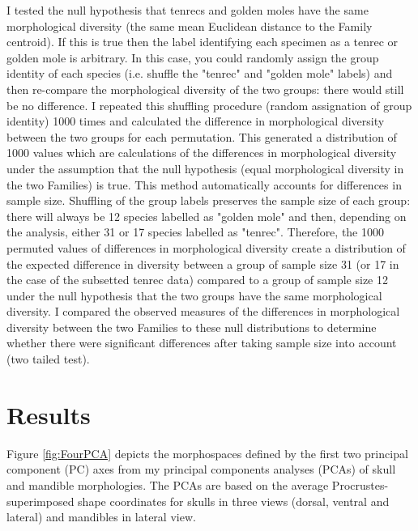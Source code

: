 
	I tested the null hypothesis that tenrecs and golden moles have the same morphological diversity (the same mean Euclidean distance to the Family centroid). If this is true then the label identifying each specimen as a tenrec or golden mole is arbitrary. In this case, you could randomly assign the group identity of each species (i.e. shuffle the "tenrec" and "golden mole" labels) and then re-compare the morphological diversity of the two groups: there would still be no difference. I repeated this shuffling procedure (random assignation of group identity) 1000 times and calculated the difference in morphological diversity between the two groups for each permutation. This generated a distribution of 1000 values which are calculations of the differences in morphological diversity under the assumption that the null hypothesis (equal morphological diversity in the two Families) is true. This method automatically accounts for differences in sample size. Shuffling of the group labels preserves the sample size of each group: there will always be 12 species labelled as "golden mole" and then, depending on the analysis, either 31 or 17 species labelled as "tenrec". Therefore, the 1000 permuted values of differences in morphological diversity create a distribution of the expected difference in diversity between a group of sample size 31 (or 17 in the case of the subsetted tenrec data) compared to a group of sample size 12 under the null hypothesis that the two groups have the same morphological diversity. I compared the observed measures of the differences in morphological diversity between the two Families to these null distributions to determine whether there were significant differences after taking sample size into account (two tailed test).

	
\newpage
\section{Results}
\label{sect:results}

	Figure \ref{fig:FourPCA} depicts the morphospaces defined by the first two principal component (PC) axes from my principal components analyses (PCAs) of skull and mandible morphologies. The PCAs are based on the average Procrustes-superimposed shape coordinates for skulls in three views (dorsal, ventral and lateral) and mandibles in lateral view.


